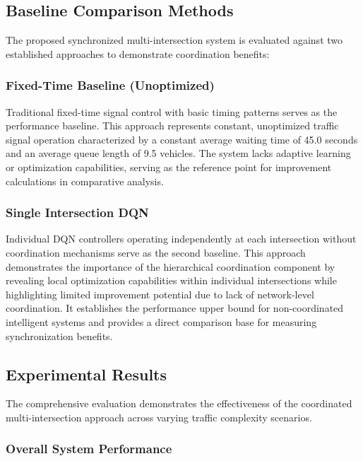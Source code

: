 \subsection{Baseline Comparison Methods}\label{subsec2b-3}

The proposed synchronized multi-intersection system is evaluated against two established 
approaches to demonstrate coordination benefits:

\subsubsection{Fixed-Time Baseline (Unoptimized)}

Traditional fixed-time signal control with basic timing patterns serves as the performance baseline. 
This approach represents constant, unoptimized traffic signal operation characterized by a constant 
average waiting time of 45.0 seconds and an average queue length of 9.5 vehicles. The system lacks 
adaptive learning or optimization capabilities, serving as the reference point for improvement 
calculations in comparative analysis.

\subsubsection{Single Intersection DQN}

Individual DQN controllers operating independently at each intersection without coordination mechanisms 
serve as the second baseline. This approach demonstrates the importance of the hierarchical coordination 
component by revealing local optimization capabilities within individual intersections while highlighting 
limited improvement potential due to lack of network-level coordination. It establishes the performance 
upper bound for non-coordinated intelligent systems and provides a direct comparison base for measuring 
synchronization benefits.

\subsection{Experimental Results}\label{subsec2b-4}

The comprehensive evaluation demonstrates the effectiveness of the coordinated multi-intersection 
approach across varying traffic complexity scenarios.

\subsubsection{Overall System Performance}

